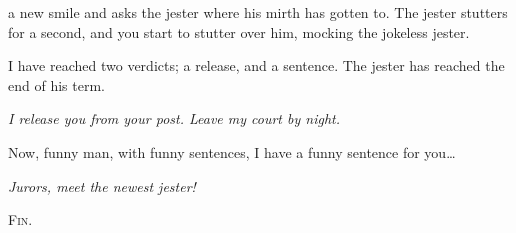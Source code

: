 a new smile and asks the jester where his mirth has gotten to.
The jester stutters for a second, and you start to stutter over him, mocking the jokeless jester.

\begin{speechtext}
  I have reached two verdicts; a release, and a sentence.
  The jester has reached the end of his term.

  \emph{I release you from your post.  Leave my court by night.}

  Now, funny man, with funny sentences, I have a funny sentence for you\ldots

  \emph{Jurors, meet the newest jester!}
\end{speechtext}

{\scshape\hfill Fin.}
